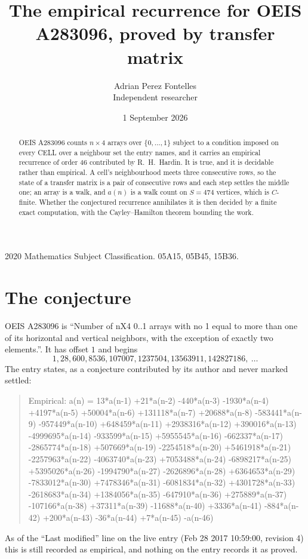 \documentclass[11pt,a4paper]{article}
\title{The empirical recurrence for OEIS A283096, proved by transfer matrix}
\author{Adrian Perez Fontelles\\ \small Independent researcher}
\date{1 September 2026}
\theoremstyle{plain}
\theoremstyle{definition}
\begin{document}
\maketitle

\begin{abstract}
OEIS A283096 counts $n\times4$ arrays over $\{0,\dots,1\}$ subject to a condition imposed on
every CELL over a neighbour set the entry names, and it carries an empirical recurrence of
order $46$ contributed by R.~H.~Hardin. It is true, and it is decidable rather than
empirical. A cell's neighbourhood meets three consecutive rows, so the state of a transfer
matrix is a pair of consecutive rows and each step settles the middle one; an array is a
walk, and $a(n)$ is a walk count on $S=474$ vertices, which is $C$-finite. Whether the
conjectured recurrence annihilates it is then decided by a finite exact computation, with the
Cayley--Hamilton theorem bounding the work.
\end{abstract}

\noindent\small 2020 Mathematics Subject Classification. 05A15, 05B45, 15B36.\normalsize

\section{The conjecture}

OEIS A283096 is ``Number of nX4 0..1 arrays with no 1 equal to more than one of its horizontal and vertical neighbors, with the exception of exactly two elements.''. It has offset $1$ and begins
\[
1, 28, 600, 8536, 107007, 1237504, 13563911, 142827186,\ \dots
\]
The entry states, as a conjecture contributed by its author and never marked settled:
\begin{quote}
Empirical: a(n) = 13*a(n-1) +21*a(n-2) -440*a(n-3) -1930*a(n-4) +4197*a(n-5) +50004*a(n-6) +131118*a(n-7) +20688*a(n-8) -583441*a(n-9) -957449*a(n-10) +648459*a(n-11) +2938316*a(n-12) +390016*a(n-13) -4999695*a(n-14) -933599*a(n-15) +5955545*a(n-16) -662337*a(n-17) -2865774*a(n-18) +507669*a(n-19) -2254518*a(n-20) +5461918*a(n-21) -2257963*a(n-22) -4063740*a(n-23) +7053488*a(n-24) -6898217*a(n-25) +5395026*a(n-26) -1994790*a(n-27) -2626896*a(n-28) +6364653*a(n-29) -7833012*a(n-30) +7478346*a(n-31) -6081834*a(n-32) +4301728*a(n-33) -2618683*a(n-34) +1384056*a(n-35) -647910*a(n-36) +275889*a(n-37) -107166*a(n-38) +37311*a(n-39) -11688*a(n-40) +3336*a(n-41) -884*a(n-42) +200*a(n-43) -36*a(n-44) +7*a(n-45) -a(n-46)
\end{quote}
As of the ``Last modified'' line on the live entry (Feb 28 2017 10:59:00, revision 4) this is still
recorded as empirical, and nothing on the entry records it as proved.
\end{document}
